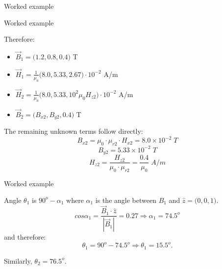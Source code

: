 {\begin{frame}{Worked example}
\end{frame}

%
%
%

\begin{frame}{Worked example}

Therefore:\\
\vspace{0.2cm}

\begin{itemize}
\item
   $\displaystyle \vec{B}_1 = \Big(1.2, 0.8, 0.4 \Big)$ T
\item
   $\displaystyle \vec{H}_1 = \frac{1}{\mu_0} \Big(8.0, 5.33, 2.67 \Big) \cdot 10^{-2}$ A/m
\item
   $\displaystyle \vec{H}_2 = \frac{1}{\mu_0} \Big(8.0, 5.33, 10^{2} \mu_0 H_{z2} \Big) \cdot 10^{-2}$ A/m
\item
   $\displaystyle \vec{B}_2 = \Big(B_{x2}, B_{y2}, 0.4 \Big)$ T
\end{itemize}

\vspace{0.2cm}

The remaining unknown terms follow directly:
\begin{equation*}
  B_{x2} = \mu_0 \cdot \mu_{r2} \cdot H_{x2} = 8.0 \times 10^{-2} \; T
\end{equation*}
\begin{equation*}
  B_{y2} = 5.33 \times 10^{-2} \; T
\end{equation*}
\begin{equation*}
  H_{z2} = \frac{H_{z2}}{\mu_0 \cdot \mu_{r2}} = \frac{0.4}{\mu_0} \; A/m
\end{equation*}

\end{frame}

%
%
%

\begin{frame}{Worked example}

Angle $\theta_1$ is $90^{o}-\alpha_1$ where $\alpha_1$ is the angle between $B_1$ and $\hat{z}=\Big(0,0,1\Big)$.
\begin{equation*}
  cos\alpha_1 = \frac{ \vec{B}_1 \cdot \hat{z} }{|\vec{B}_1|} = 0.27 \Rightarrow \alpha_1 = 74.5^{o}
\end{equation*}
and therefore:
\begin{equation*}
  \theta_1 = 90^{o}-74.5^{o} \Rightarrow  \theta_1 = 15.5^{o}.
\end{equation*}

Similarly, $\theta_2 = 76.5^{o}$.

\end{frame}

} %



